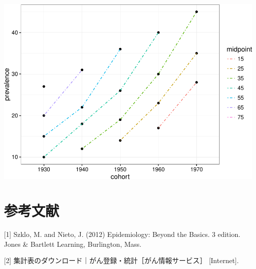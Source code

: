 \documentclass[11pt,]{article}
\begin{document}
\includegraphics{guidance_files/figure-latex/unnamed-chunk-6-1.pdf}

\section*{参考文献}

\hypertarget{refs}{}
\hypertarget{ref-szkloux5fepidemiology:ux5f2012}{}
{[}1{]} Szklo, M. and Nieto, J. (2012) Epidemiology: Beyond the Basics.
3 edition. Jones \& Bartlett Learning, Burlington, Mass.

\hypertarget{ref-rikan}{}
{[}2{]} 集計表のダウンロード｜がん登録・統計［がん情報サービス］
{[}Internet{]}.
\end{document}
